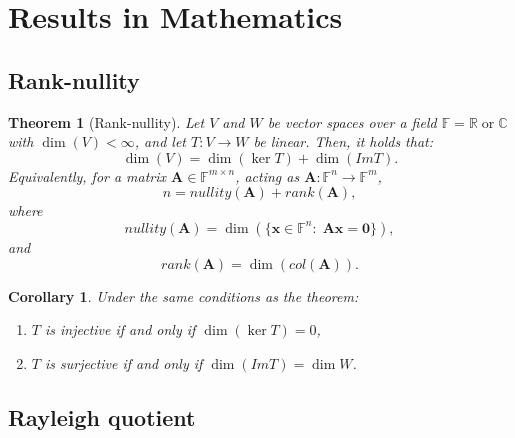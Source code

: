 \documentclass{article}
\newtheorem{theo}{Theorem}[section]
\newtheorem{cor}{Corollary}[section]
\begin{document}
\newpage

\appendix


\section{Results in Mathematics}
\label{ap:results_maths}

\subsection{Rank-nullity}
\label{ap:rank_nullity}

\begin{theo}[Rank-nullity]
    Let $V$ and $W$ be vector spaces over a field $\mathbb{F} = \mathbb{R} \; \text{or} \; \mathbb{C}$ with $\dim(V) < \infty$, and let $T: V \longrightarrow W$ be linear. Then, it holds that:
    \begin{equation}
    \nonumber
        \dim(V) = \dim ( \ker T) + \dim (Im T).
    \end{equation}
    Equivalently, for a matrix $\mathbf{A}\in \mathbb{F}^{m\times n}$, acting as $\mathbf{A}: \mathbb{F}^n \longrightarrow \mathbb{F}^m$,
    \begin{equation}
    \nonumber
        n = nullity(\mathbf{A}) + rank(\mathbf{A}),
    \end{equation} 
    where 
    \begin{equation}
    \nonumber
        nullity (\mathbf{A}) = \dim (\{ \mathbf{x}\in \mathbb{F}^n:\; \mathbf{A} \mathbf{x} = \mathbf{0} \}),
    \end{equation}
    and
    \begin{equation}
    \nonumber
        rank(\mathbf{A}) = \dim (col(\mathbf{A})).
    \end{equation}
\end{theo}


\begin{cor} Under the same conditions as the theorem:
    \begin{enumerate}
        \item $T$ is injective if and only if $\dim (\ker T) = 0$,
        \item $T$ is surjective if and only if $\dim (ImT) = \dim W$.
    \end{enumerate}
\end{cor}

\subsection{Rayleigh quotient}
\label{ap:rayleigh_quotient}
\end{document}
